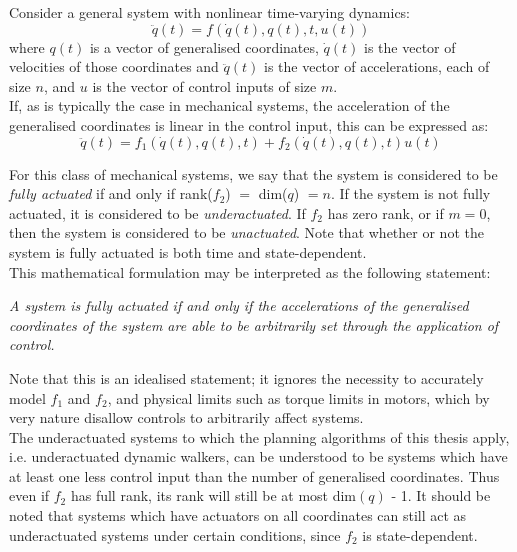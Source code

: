 Consider a general system with nonlinear time-varying dynamics:
\begin{equation}
	\ddot{q}(t) = f\left(\dot{q}(t), q(t), t, u(t)\right)
\end{equation}
where $q(t)$ is a vector of generalised coordinates, $\dot{q}(t)$ is the vector of velocities of those coordinates and $\ddot{q}(t)$ is the vector of accelerations, each of size $n$, and $u$ is the vector of control inputs of size $m$. \\

If, as is typically the case in mechanical systems, the acceleration of the generalised coordinates is linear in the control input, this can be expressed as: \\
\begin{equation}
	\ddot{q}(t) = f_1\left(\dot{q}(t), q(t), t\right) + f_2\left(\dot{q}(t), q(t), t\right)u(t)
\end{equation}

For this class of mechanical systems, we say that the system is considered to be \textit{fully actuated} if and only if rank($f_2$) $=$ dim($q$) $= n$. If the system is not fully actuated, it is considered to be \textit{underactuated}. If $f_2$ has zero rank, or if $m=0$, then the system is considered to be \textit{unactuated}. Note that whether or not the system is fully actuated is both time and state-dependent.  \\

This mathematical formulation may be interpreted as the following statement:

\textit{A system is fully actuated if and only if the accelerations of the generalised coordinates of the system are able to be arbitrarily set through the application of control.}

Note that this is an idealised statement; it ignores the necessity to accurately model $f_1$ and $f_2$, and physical limits such as torque limits in motors, which by very nature disallow controls to arbitrarily affect systems. \\

The underactuated systems to which the planning algorithms of this thesis apply, i.e. underactuated dynamic walkers, can be understood to be systems which have at least one less control input than the number of generalised coordinates. Thus even if $f_2$ has full rank, its rank will still be at most dim$(q)$ - 1. It should be noted that systems which have actuators on all coordinates can still act as underactuated systems under certain conditions, since $f_2$ is state-dependent.